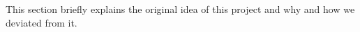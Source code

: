 This section briefly explains the original idea of this project and why and how we deviated from it.
